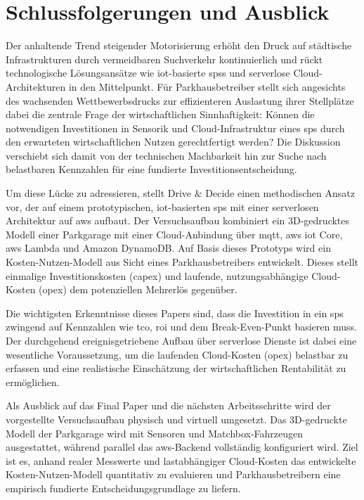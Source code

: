 \section{Schlussfolgerungen und Ausblick}\label{sec:conclusion}

Der anhaltende Trend steigender Motorisierung erhöht den Druck auf städtische Infrastrukturen durch vermeidbaren Suchverkehr kontinuierlich und rückt technologische Lösungsansätze wie \ac{iot}-basierte \acp{sps} und serverlose Cloud-Architekturen in den Mittelpunkt. Für Parkhausbetreiber stellt sich angesichts des wachsenden Wettbewerbsdrucks zur effizienteren Auslastung ihrer Stellplätze dabei die zentrale Frage der wirtschaftlichen Sinnhaftigkeit: Können die notwendigen Investitionen in Sensorik und Cloud-Infrastruktur eines \ac{sps} durch den erwarteten wirtschaftlichen Nutzen gerechtfertigt werden? Die Diskussion verschiebt sich damit von der technischen Machbarkeit hin zur Suche nach belastbaren Kennzahlen für eine fundierte Investitionsentscheidung.

Um diese Lücke zu adressieren, stellt Drive \& Decide einen methodischen Ansatz vor, der auf einem prototypischen, \ac{iot}-basierten \ac{sps} mit einer serverlosen Architektur auf \ac{aws} aufbaut. Der Versuchsaufbau kombiniert ein 3D-gedrucktes Modell einer Parkgarage mit einer Cloud-Anbindung über \ac{mqtt}, \ac{aws} \ac{iot} Core, \ac{aws} Lambda und Amazon DynamoDB. Auf Basis dieses Prototyps wird ein Kosten-Nutzen-Modell aus Sicht eines Parkhausbetreibers entwickelt. Dieses stellt einmalige Investitionskosten (\ac{capex}) und laufende, nutzungsabhängige Cloud-Kosten (\ac{opex}) dem potenziellen Mehrerlös gegenüber.

Die wichtigsten Erkenntnisse dieses Papers sind, dass die Investition in ein \ac{sps} zwingend auf Kennzahlen wie \ac{tco}, \ac{roi} und dem Break-Even-Punkt basieren muss. Der durchgehend ereignisgetriebene Aufbau über serverlose Dienste ist dabei eine wesentliche Voraussetzung, um die laufenden Cloud-Kosten (\ac{opex}) belastbar zu erfassen und eine realistische Einschätzung der wirtschaftlichen Rentabilität zu ermöglichen.

Als Ausblick auf das Final Paper und die nächsten Arbeitsschritte wird der vorgestellte Versuchsaufbau physisch und virtuell umgesetzt. Das 3D-gedruckte Modell der Parkgarage wird mit Sensoren und Matchbox-Fahrzeugen ausgestattet, während parallel das \ac{aws}-Backend vollständig konfiguriert wird. Ziel ist es, anhand realer Messwerte und lastabhängiger Cloud-Kosten das entwickelte Kosten-Nutzen-Modell quantitativ zu evaluieren und Parkhausbetreibern eine empirisch fundierte Entscheidungsgrundlage zu liefern.
